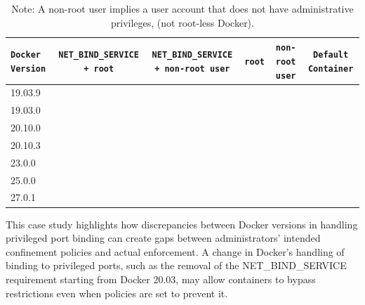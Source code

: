 \documentclass[12pt]{report}
\newcommand{\cmark}{\ding{51}} \newcommand{\xmark}{\ding{55}} \newcommand{\etal}{et~al.\ }
\begin{document}
\begin{doublespace}
\begin{table}[h]
    \centering
    \caption{Ability for a container to bind to privileged ports}
    \label{tab:port-binding-pre-20.03}
    \scriptsize
    \begin{tabular}{|p{2.5cm}|c|c|c|c|c|}
        \hline
        \texttt{Docker Version} & \texttt{NET\_BIND\_SERVICE + root} & \texttt{NET\_BIND\_SERVICE + non-root user} & \texttt{root} & \texttt{non-root user} & \texttt{Default Container} \\ \hline
        19.03.9                & \cmark                         & \xmark                               & \xmark      & \xmark           & \xmark                                      \\ \hline
        19.03.0                & \cmark                         & \xmark                               & \xmark      & \xmark           & \xmark                                      \\ \hline
        20.10.0                & \cmark                         & \xmark                              & \xmark      & \xmark           & \xmark                                      \\ \hline
        20.10.3                & \cmark                         & \xmark                              & \xmark      & \xmark           & \xmark                                      \\ \hline
        23.0.0                 & \cmark                         & \cmark                              & \cmark      & \xmark           & \xmark                                      \\ \hline
        25.0.0                 & \cmark                         & \cmark                              & \cmark      & \xmark           & \xmark                                      \\ \hline
        27.0.1                 & \cmark                         & \cmark                              & \cmark      & \xmark           & \xmark                                      \\ \hline
    \end{tabular}
    \caption*{
        Note: A non-root user implies a user account that does not have administrative privileges, (not root-less Docker).
    }
\end{table}

This case study highlights how discrepancies between Docker versions in handling privileged port binding can create gaps between administrators' intended confinement policies and actual enforcement. A change in Docker's handling of binding to privileged ports, such as the removal of the NET\_BIND\_SERVICE requirement starting from Docker 20.03, may allow containers to bypass restrictions even when policies are set to prevent it. 


\end{doublespace}
\end{document}
